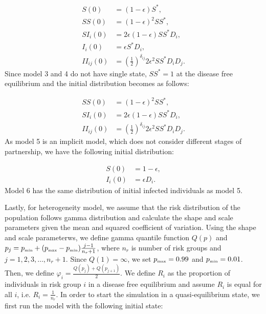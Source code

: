 \documentclass[10pt,letterpaper]{article}
\newcommand{\khalf}{\left(\frac{1}{2}\right)^{\delta_{ij}}}  %
\newcommand{\tsub}[2]{#1_{{\textrm{\tiny #2}}}}
\begin{document}
\begin{equation}
\begin{aligned}
S(0) &= (1 - \epsilon) S^*, \\
SS(0) &= (1 - \epsilon)^2 SS^*,\\
SI_i(0) &= 2 \epsilon (1-\epsilon) SS^* D_i,\\
I_i(0) &=  \epsilon S^* D_i,\\
II_{ij}(0) &=  \khalf 2\epsilon^2 SS^* D_i D_j.
\end{aligned}
\end{equation}
Since model 3 and 4 do not have single state, $SS^*=1$ at the disease free equilibrium and the initial distribution becomes as follows:

\begin{equation}
\begin{aligned}
SS(0) &= (1 - \epsilon)^2 SS^*,\\
SI_i(0) &= 2 \epsilon (1-\epsilon) SS^* D_i,\\
II_{ij}(0) &=  \khalf 2\epsilon^2 SS^* D_i D_j.
\end{aligned}
\end{equation}
As model 5 is an implicit model, which does not consider different stages of partnership, we have the following initial distribution:

\begin{equation}
\begin{aligned}
S(0) &= 1 - \epsilon,\\
I_i(0) &=  \epsilon D_i.
\end{aligned}
\end{equation}
Model 6 has the same distribution of initial infected individuals as model 5.

Lastly, for heterogeneity model, we assume that the risk distribution of the population follows gamma distribution and calculate the shape and scale parameters given the mean and squared coefficient of variation. Using the shape and scale parameterws, we define gamma quantile function $Q(p)$ and $p_j =  \tsub{p}{min} + (\tsub{p}{max} - \tsub{p}{min}) \frac{j-1}{n_r + 1}$, where $n_r$ is number of risk groups and $j = 1, 2, 3, \dots, n_r + 1$. Since $Q(1) = \infty$, we set $\tsub{p}{max} = 0.99$ and $\tsub{p}{min} = 0.01$. Then, we define $\varphi_i = \frac{Q(p_j) + Q(p_{j+1})}{2}$. We define $R_i$ as the proportion of individuals in risk group $i$ in a disease free equilibrium and assume $R_i$ is equal for all $i$, i.e. $R_i = \frac{1}{n_r}$. In order to start the simulation in a quasi-equilibrium state, we first run the model with the following initial state:
\end{document}
